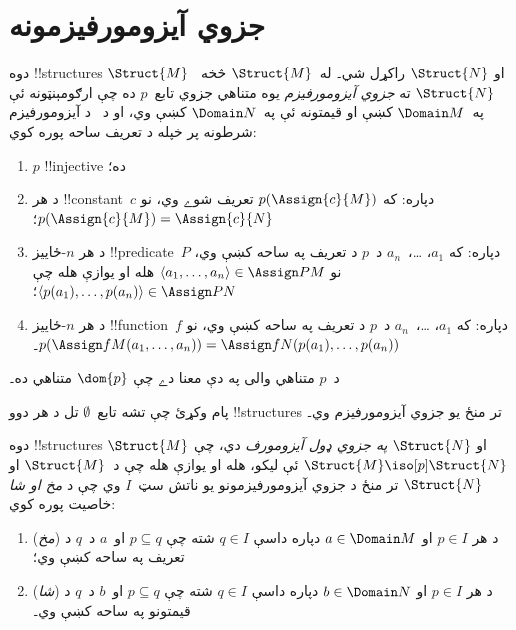\documentclass[../../../include/open-logic-section]{subfiles}
\begin{document}
\section{جزوي آيزومورفيزمونه}

\begin{defn}
  دوه !!{structure}s $\Struct{M}$ او $\Struct{N}$ راکړل شي۔
  له~$\Struct{M}$ څخه~$\Struct{N}$ ته \emph{جزوي آيزومورفيزم} يوه
  متناهي جزوي تابع~$p$ ده چې ارګومېنټونه ئې په~$\Domain M$ کښې او
  قيمتونه ئې په~$\Domain N$ کښې وي، او د~
  د آيزومورفيزم شرطونه پر خپله د تعريف ساحه پوره کوي:
  \begin{enumerate}
  \item $p$ !!{injective} ده؛
  \item د هر !!{constant}~$c$ دپاره: که $p(\Assign{c}{M})$ تعريف
    شوے وي، نو $p(\Assign{c}{M}) = \Assign{c}{N}$؛
  \item د هر $n$-ځاييز !!{predicate}~$P$ دپاره: که $a_1$،
    \dots،~$a_n$ د~$p$ د تعريف په ساحه کښې وي، نو
    $\langle a_1, \dots, a_n\rangle \in \Assign P M$ هله او يوازې
    هله چې $\langle p(a_1), \dots, p(a_n) \rangle \in \Assign P N$؛
  \item د هر $n$-ځاييز !!{function}~$f$ دپاره: که $a_1$،
    \dots،~$a_n$ د~$p$ د تعريف په ساحه کښې وي، نو
    $p(\Assign f M (a_1, \dots,a_n)) =
    \Assign f N (p(a_1), \dots, p(a_n))$۔
  \end{enumerate}
  د~$p$ متناهي والی په دې معنا دے چې $\dom{p}$ متناهي ده۔
\end{defn}

پام وکړئ چې تشه تابع~$\emptyset$ تل د هر دوو !!{structure}s تر منځ
يو جزوي آيزومورفيزم وي۔

\begin{defn}
  دوه !!{structure}s $\Struct{M}$ او $\Struct{N}$
  \emph{په جزوي ډول آيزومورف} دي، چې $\Struct{M} \iso[p]
  \Struct{N}$ ئې ليکو، هله او يوازې هله چې د~$\Struct{M}$ او
  $\Struct{N}$ تر منځ د جزوي آيزومورفيزمونو يو ناتش سټ~$I$ وي چې د
  \emph{مخ او شا} خاصيت پوره کوي:
  \begin{enumerate}
  \item (\emph{مخ}) د هر $p \in I$ او $a \in \Domain M$ دپاره داسې
    $q \in I$ شته چې $p \subseteq q$ او~$a$ د~$q$ د تعريف په ساحه
    کښې وي؛
  \item (\emph{شا}) د هر $p \in I$ او $b \in \Domain N$ دپاره داسې
    $q \in I$ شته چې $p \subseteq q$ او~$b$ د~$q$ د قيمتونو په ساحه
    کښې وي۔
  \end{enumerate}
\end{defn}
\end{document}
